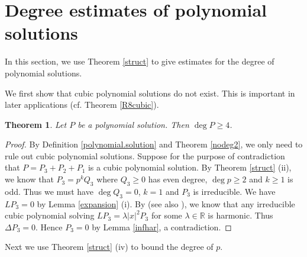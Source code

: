 \documentclass[pdflatex,sn-mathphys-num]{sn-jnl}%
\theoremstyle{thmstyleone}%
\newtheorem{theorem}{Theorem}[section]%
\theoremstyle{thmstyletwo}%
\theoremstyle{thmstylethree}%
\newcommand{\R}{\mathbb{R}}
\begin{document}
\section{Degree estimates of polynomial solutions}
\label{4}
In this section, we use Theorem \ref{struct} to give estimates for the degree of polynomial solutions.

We first show that cubic polynomial solutions do not exist. This is important in later applications (cf. Theorem \ref{R8cubic}).
\begin{theorem}\label{nodeg23}
	Let $P$ be a polynomial solution. Then $\deg P\ge 4$.
\end{theorem}

\begin{proof}By Definition \ref{polynomial.solution} and Theorem \ref{nodeg2}, we only need to rule out cubic polynomial solutions. Suppose for the purpose of contradiction that $P=P_3+P_2+P_1$ is a cubic polynomial solution. By Theorem \ref{struct} (ii), we know that $P_3=p ^kQ_3$ where $Q_3\ge0$ has even degree, $\deg p\ge 2$ and $k\ge 1$ is odd. Thus we must have $\deg Q_3=0$, $k=1$ and $P_3$ is irreducible. We have $LP_3=0$ by Lemma \ref{expansion} (i). By  \cite[Theorem 1]{tkachev2010classification} (see also \cite[Theorem 6.6.1]{NTV}), we know that any irreducible cubic polynomial solving $LP_3=\lambda|x|^2P_3$ for some $\lambda\in\R$ is harmonic. Thus $\Delta P_3=0$.  Hence $P_3=0$ by Lemma \ref{infhar}, a contradiction.
\end{proof}
Next we use Theorem \ref{struct} (iv) to bound the degree of $p$.
\end{document}

